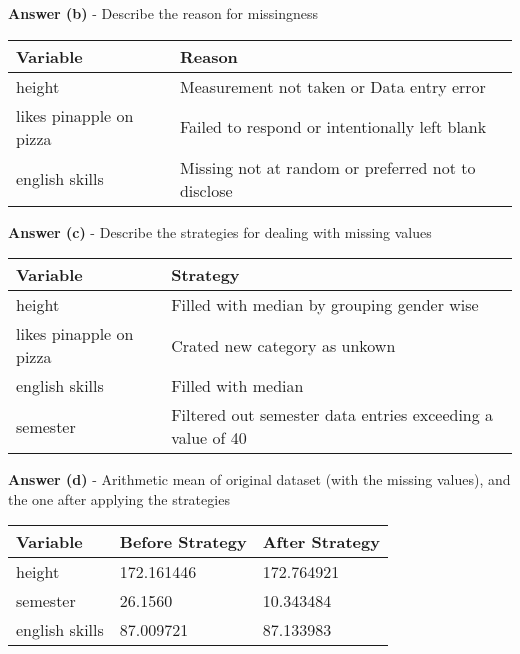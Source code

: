 \documentclass[a4paper,10pt]{article}\setlength{\textheight}{10in}\setlength{\textwidth}{6.5in}\setlength{\topmargin}{-0.125in}\setlength{\oddsidemargin}{-.2in}\setlength{\evensidemargin}{-.2in}\setlength{\headsep}{0.2in}\setlength{\footskip}{0pt}\usepackage{amsmath}\usepackage{fancyhdr}\usepackage{enumitem}\usepackage{hyperref}\usepackage{xcolor}\usepackage{graphicx}\usepackage[export]{adjustbox}\usepackage{caption}\usepackage{float}\usepackage{booktabs}\usepackage{makecell}\pagestyle{fancy}
\begin{document}
\begin{enumerate}[topsep=0mm, partopsep=0mm, leftmargin=*]
\textbf{Answer (b)} - Describe the reason for missingness
\begin{center}
\begin{tabular}{ll}
\toprule
\textbf{Variable} & \textbf{Reason} \\ \midrule
height & Measurement not taken or Data entry error \\
likes pinapple on pizza  & Failed to respond or intentionally left blank \\
english skills & Missing not at random or preferred not to disclose  \\
\bottomrule
\end{tabular}
\end{center}

\textbf{Answer (c)} - Describe the strategies for dealing with missing values
\begin{center}
\begin{tabular}{ll}
\toprule
\textbf{Variable} & \textbf{Strategy} \\ \midrule
height & Filled with median by grouping gender wise \\
likes pinapple on pizza  & Crated new category as unkown \\
english skills & Filled with median \\
semester & Filtered out semester data entries exceeding a value of 40 \\
\bottomrule
\end{tabular}
\end{center}

\textbf{Answer (d)} - Arithmetic mean of original dataset (with the missing values), and the one after applying the strategies
\begin{center}
\begin{tabular}{lll}
\toprule
\textbf{Variable} & \textbf{Before Strategy} & \textbf{After Strategy} \\ \midrule
height & 172.161446 & 172.764921 \\
semester & 26.1560 & 10.343484 \\
english skills & 87.009721 & 87.133983 \\
\bottomrule
\end{tabular}
\end{center}

\end{enumerate}
\end{document}
